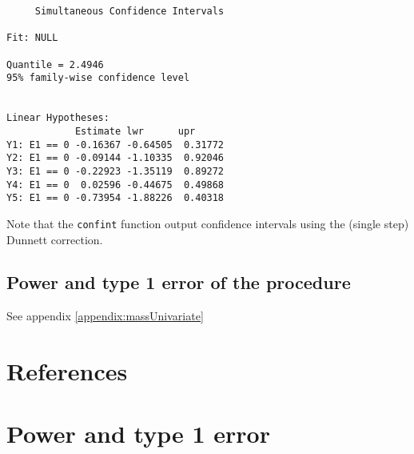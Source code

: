\documentclass{article}
\begin{document}
\begin{verbatim}
	 Simultaneous Confidence Intervals

Fit: NULL

Quantile = 2.4946
95% family-wise confidence level
 

Linear Hypotheses:
            Estimate lwr      upr     
Y1: E1 == 0 -0.16367 -0.64505  0.31772
Y2: E1 == 0 -0.09144 -1.10335  0.92046
Y3: E1 == 0 -0.22923 -1.35119  0.89272
Y4: E1 == 0  0.02596 -0.44675  0.49868
Y5: E1 == 0 -0.73954 -1.88226  0.40318
\end{verbatim}
Note that the \texttt{confint} function output confidence intervals using
the (single step) Dunnett correction.

\subsection{Power and type 1 error of the procedure}
\label{sec:orga77729f}

See appendix \ref{appendix:massUnivariate}

\clearpage

\section{References}
\label{sec:org4adb0cb}



\clearpage

\appendix

\section{Power and type 1 error}
\label{sec:orgc6bd93e}
\end{document}
